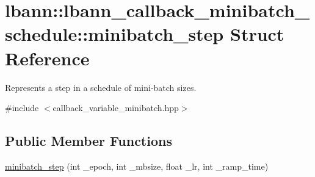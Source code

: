 \hypertarget{structlbann_1_1lbann__callback__minibatch__schedule_1_1minibatch__step}{}\section{lbann\+:\+:lbann\+\_\+callback\+\_\+minibatch\+\_\+schedule\+:\+:minibatch\+\_\+step Struct Reference}
\label{structlbann_1_1lbann__callback__minibatch__schedule_1_1minibatch__step}


Represents a step in a schedule of mini-\/batch sizes.  




{\ttfamily \#include $<$callback\+\_\+variable\+\_\+minibatch.\+hpp$>$}

\subsection*{Public Member Functions}
\begin{DoxyCompactItemize}
\item 
\hyperlink{structlbann_1_1lbann__callback__minibatch__schedule_1_1minibatch__step_a76efb978eebc607dd1f7be0e464ac447}{minibatch\+\_\+step} (int \+\_\+epoch, int \+\_\+mbsize, float \+\_\+lr, int \+\_\+ramp\+\_\+time)
\end{DoxyCompactItemize}
